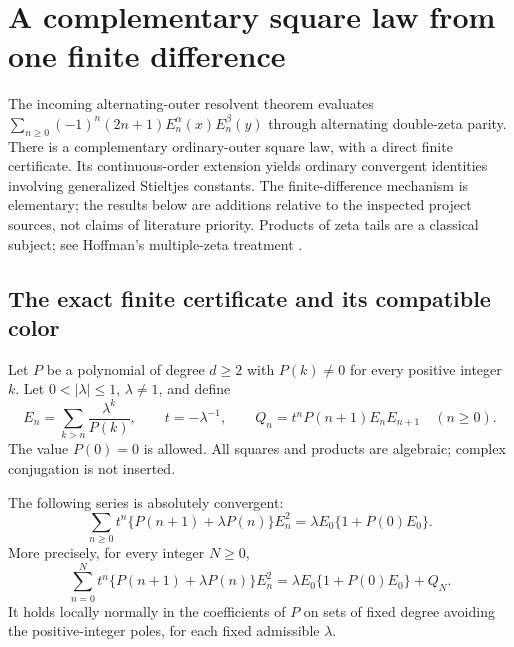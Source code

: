 
\section{A complementary square law from one finite difference}
\label{ats:section}

The incoming alternating-outer resolvent theorem \cite{HTST} evaluates
$\sum_{n\ge0}(-1)^n(2n+1)E_n^\alpha(x)E_n^\beta(y)$ through
alternating double-zeta parity.  There is a complementary ordinary-outer
square law, with a direct finite certificate.  Its continuous-order
extension yields ordinary convergent identities involving generalized
Stieltjes constants.  The finite-difference mechanism is elementary;
the results below are additions relative to the inspected project
sources, not claims of literature priority.  Products of zeta tails are
a classical subject; see Hoffman's multiple-zeta treatment \cite{Hoffman}.

\subsection{The exact finite certificate and its compatible color}

Let $P$ be a polynomial of degree $d\ge2$ with $P(k)\ne0$ for every
positive integer $k$. Let $0<|\lambda|\le1$, $\lambda\ne1$, and define
\[
 E_n=\sum_{k>n}\frac{\lambda^k}{P(k)},\qquad
 t=-\lambda^{-1},\qquad
 Q_n=t^nP(n+1)E_nE_{n+1}\quad(n\ge0).
\]
The value $P(0)=0$ is allowed. All squares and products are algebraic;
complex conjugation is not inserted.

\begin{theorem}
\label{ats:thm:polynomial}
The following series is absolutely convergent:
\begin{equation}\label{ats:eq:polynomial}
 \sum_{n\ge0}t^n\{P(n+1)+\lambda P(n)\}E_n^2
 =\lambda E_0\{1+P(0)E_0\}.
\end{equation}
More precisely, for every integer $N\ge0$,
\begin{equation}\label{ats:eq:finite}
 \sum_{n=0}^{N}t^n\{P(n+1)+\lambda P(n)\}E_n^2
 =\lambda E_0\{1+P(0)E_0\}+Q_N.
\end{equation}
It holds locally normally in the coefficients of $P$ on sets of fixed
degree avoiding the positive-integer poles, for each fixed admissible
$\lambda$.
\end{theorem}

